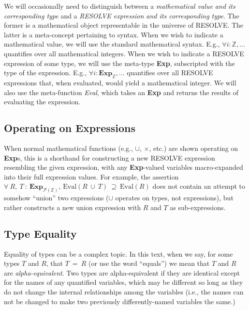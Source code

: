 We will occasionally need to distinguish between a \emph{mathematical value and its corresponding type} and a \emph{RESOLVE expression and its corresponding type}.  The former is a mathematical object representable in the universe of RESOLVE.  The latter is a meta-concept pertaining to syntax.  When we wish to indicate a mathematical value, we will use the standard mathematical syntax.  E.g., $\forall i : \mathbb{Z}, ...$ quantifies over all mathematical integers.  When we wish to indicate a RESOLVE expression of some type, we will use the meta-type \textbf{Exp}, subscripted with the type of the expression.  E.g., $\forall i : \textbf{Exp}_\mathbb{Z}, ...$ quantifies over all RESOLVE expressions that, when evaluated, would yield a mathematical integer.  We will also use the meta-function \emph{Eval}, which takes an \textbf{Exp} and returns the results of evaluating the expression.
	\subsection{Operating on Expressions\label{operatingOnExpressions}}

\begin{sloppypar}
When normal mathematical functions (e.g., $\cup$, $\times$, etc.) are shown operating on \textbf{Exp}s, this is a shorthand for constructing a new RESOLVE expression resembling the given expression, with any \textbf{Exp}-valued variables macro-expanded into their full expression values.  For example, the assertion $\forall~R,~T~:~\textbf{Exp}_{\mathcal{P}(\mathbb{Z})},~\text{Eval}(R~\cup~T)~\supseteq~\text{Eval}(R)$ does not contain an attempt to somehow ``union'' two expressions ($\cup$ operates on types, not expressions), but rather constructs a new union expression with $R$ and $T$ as sub-expressions.
\end{sloppypar}
	\subsection{Type Equality\label{typeEquality}}	

Equality of types can be a complex topic.  In this text, when we say, for some types $T$ and $R$, that $T~=~R$ (or use the word ``equals'') we mean that $T$ and $R$ are \emph{alpha-equivalent}.  Two types are alpha-equivalent if they are identical except for the names of any quantified variables, which may be different so long as they do not change the internal relationships among the variables (i.e., the names can not be changed to make two previously differently-named variables the same.)


